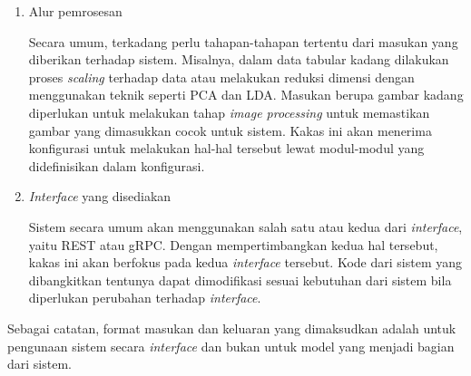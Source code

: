 \begin{enumerate}
	\item Alur pemrosesan
	
	Secara umum, terkadang perlu tahapan-tahapan tertentu dari masukan yang diberikan terhadap sistem.
	Misalnya, dalam data tabular kadang dilakukan proses \textit{scaling} terhadap data atau melakukan reduksi dimensi dengan menggunakan teknik seperti PCA dan LDA.
	Masukan berupa gambar kadang diperlukan untuk melakukan tahap \textit{image processing} untuk memastikan gambar yang dimasukkan cocok untuk sistem.
	Kakas ini akan menerima konfigurasi untuk melakukan hal-hal tersebut lewat modul-modul yang didefinisikan dalam konfigurasi.

	\item \textit{Interface} yang disediakan

	Sistem secara umum akan menggunakan salah satu atau kedua dari \textit{interface}, yaitu REST atau gRPC.
	Dengan mempertimbangkan kedua hal tersebut, kakas ini akan berfokus pada kedua \textit{interface} tersebut.
	Kode dari sistem yang dibangkitkan tentunya dapat dimodifikasi sesuai kebutuhan dari sistem bila diperlukan perubahan terhadap \textit{interface}.

\end{enumerate}

Sebagai catatan, format masukan dan keluaran yang dimaksudkan adalah untuk pengunaan sistem secara \textit{interface} dan bukan untuk model yang menjadi bagian dari sistem.